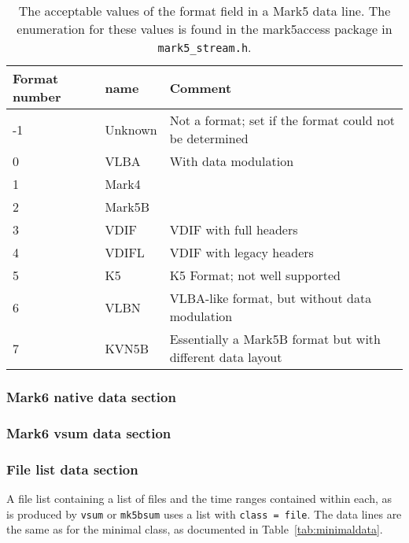 \documentclass[12pt]{article}
\begin{document}
\begin{table}[h]
\begin{tabularx}{\textwidth}{llX}
\hline
Format number & name & Comment \\
\hline
-1 & Unknown & Not a format; set if the format could not be determined \\
0  & VLBA & With data modulation \\
1  & Mark4 & \\
2  & Mark5B & \\
3  & VDIF & VDIF with full headers \\
4  & VDIFL & VDIF with legacy headers \\
5  & K5 & K5 Format; not well supported \\
6  & VLBN & VLBA-like format, but without data modulation \\
7  & KVN5B & Essentially a Mark5B format but with different data layout \\
\hline
\hline
\end{tabularx}
\caption{\label{tab:mark5formats}
The acceptable values of the format field in a Mark5 data line.
The enumeration for these values is found in the mark5access package in {\tt mark5\_stream.h}.
}
\end{table}

\subsubsection{Mark6 native data section}

\subsubsection{Mark6 vsum data section}

\subsubsection{File list data section}

A file list containing a list of files and the time ranges contained within each, as is produced by {\tt vsum} or {\tt mk5bsum} uses a list with {\tt class = file}.
The data lines are the same as for the minimal class, as documented in Table~\ref{tab:minimaldata}.
\end{document}
